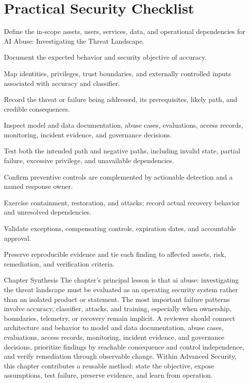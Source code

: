 \documentclass[11pt,letterpaper]{article}
\begin{document}
\section*{Practical Security Checklist}
\begin{CornellChecklist}
\item Define the in-scope assets, users, services, data, and operational dependencies for AI Abuse: Investigating the Threat Landscape.
\item Document the expected behavior and security objective of accuracy.
\item Map identities, privileges, trust boundaries, and externally controlled inputs associated with accuracy and classifier.
\item Record the threat or failure being addressed, its prerequisites, likely path, and credible consequences.
\item Inspect model and data documentation, abuse cases, evaluations, access records, monitoring, incident evidence, and governance decisions.
\item Test both the intended path and negative paths, including invalid state, partial failure, excessive privilege, and unavailable dependencies.
\item Confirm preventive controls are complemented by actionable detection and a named response owner.
\item Exercise containment, restoration, and attacks; record actual recovery behavior and unresolved dependencies.
\item Validate exceptions, compensating controls, expiration dates, and accountable approval.
\item Preserve reproducible evidence and tie each finding to affected assets, risk, remediation, and verification criteria.
\end{CornellChecklist}
\begin{CornellSummaryBox}{Chapter Synthesis}
The chapter's principal lesson is that ai abuse: investigating the threat landscape must be evaluated as an operating security system rather than an isolated product or statement. The most important failure patterns involve accuracy, classifier, attacks, and training, especially when ownership, boundaries, telemetry, or recovery remain implicit. A reviewer should connect architecture and behavior to model and data documentation, abuse cases, evaluations, access records, monitoring, incident evidence, and governance decisions, prioritize findings by reachable consequence and control independence, and verify remediation through observable change. Within Advanced Security, this chapter contributes a reusable method: state the objective, expose assumptions, test failure, preserve evidence, and learn from operation.
\end{CornellSummaryBox}
\end{document}
